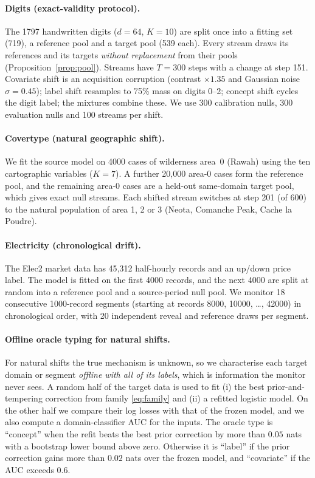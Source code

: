 \paragraph{Digits (exact-validity protocol).} The 1797 handwritten digits ($d=64$, $K=10$) are split once into a fitting set (719), a reference pool and a target pool (539 each). Every stream draws its references and its targets \emph{without replacement} from their pools (Proposition~\ref{prop:pool}). Streams have $T=300$ steps with a change at step 151. Covariate shift is an acquisition corruption (contrast $\times1.35$ and Gaussian noise $\sigma=0.45$); label shift resamples to 75\% mass on digits 0--2; concept shift cycles the digit label; the mixtures combine these. We use 300 calibration nulls, 300 evaluation nulls and 100 streams per shift.

\paragraph{Covertype (natural geographic shift).} We fit the source model on 4000 cases of wilderness area~0 (Rawah) using the ten cartographic variables ($K=7$). A further 20{,}000 area-0 cases form the reference pool, and the remaining area-0 cases are a held-out same-domain target pool, which gives exact null streams. Each shifted stream switches at step 201 (of 600) to the natural population of area 1, 2 or 3 (Neota, Comanche Peak, Cache la Poudre).

\paragraph{Electricity (chronological drift).} The Elec2 market data \citep{harries1999} has 45{,}312 half-hourly records and an up/down price label. The model is fitted on the first 4000 records, and the next 4000 are split at random into a reference pool and a source-period null pool. We monitor 18 consecutive 1000-record segments (starting at records 8000, 10000, \dots, 42000) in chronological order, with 20 independent reveal and reference draws per segment.

\paragraph{Offline oracle typing for natural shifts.} For natural shifts the true mechanism is unknown, so we characterise each target domain or segment \emph{offline with all of its labels}, which is information the monitor never sees. A random half of the target data is used to fit (i) the best prior-and-tempering correction from family \eqref{eq:family} and (ii) a refitted logistic model. On the other half we compare their log losses with that of the frozen model, and we also compute a domain-classifier AUC for the inputs. The oracle type is ``concept'' when the refit beats the best prior correction by more than $0.05$ nats with a bootstrap lower bound above zero. Otherwise it is ``label'' if the prior correction gains more than $0.02$ nats over the frozen model, and ``covariate'' if the AUC exceeds $0.6$.

